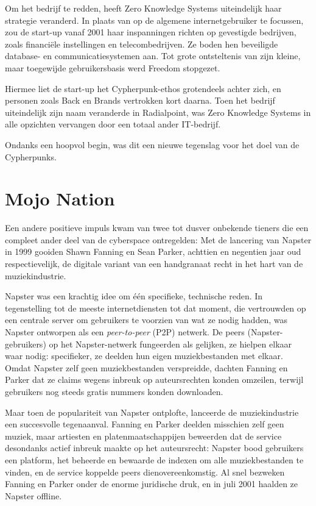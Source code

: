 \documentclass[
  a5paper,
  smalldemyvopaper,11pt,twoside,onecolumn,openright,extrafontsizes]{memoir}
\begin{document}
Om het bedrijf te redden, heeft Zero Knowledge Systems uiteindelijk haar
strategie veranderd. In plaats van op de algemene internetgebruiker te
focussen, zou de start-up vanaf 2001 haar inspanningen richten op
gevestigde bedrijven, zoals financiële instellingen en telecombedrijven.
Ze boden hen beveiligde database- en communicatiesystemen aan. Tot grote
ontsteltenis van zijn kleine, maar toegewijde gebruikersbasis werd
Freedom stopgezet.

Hiermee liet de start-up het Cypherpunk-ethos grotendeels achter zich,
en personen zoals Back en Brands vertrokken kort daarna. Toen het
bedrijf uiteindelijk zijn naam veranderde in Radialpoint, was Zero
Knowledge Systems in alle opzichten vervangen door een totaal ander
IT-bedrijf.

Ondanks een hoopvol begin, was dit een nieuwe tegenslag voor het doel
van de Cypherpunks.

\section{Mojo Nation}\label{mojo-nation}

Een andere positieve impuls kwam van twee tot dusver onbekende tieners
die een compleet ander deel van de cyberspace ontregelden: Met de
lancering van Napster in 1999 gooiden Shawn Fanning en Sean Parker,
achttien en negentien jaar oud respectievelijk, de digitale variant van
een handgranaat recht in het hart van de muziekindustrie.

Napster was een krachtig idee om één specifieke, technische reden. In
tegenstelling tot de meeste internetdiensten tot dat moment, die
vertrouwden op een centrale server om gebruikers te voorzien van wat ze
nodig hadden, was Napster ontworpen als een \emph{peer-to-peer} (P2P)
netwerk. De peers (Napster-gebruikers) op het Napster-netwerk fungeerden
als gelijken, ze hielpen elkaar waar nodig: specifieker, ze deelden hun
eigen muziekbestanden met elkaar. Omdat Napster zelf geen
muziekbestanden verspreidde, dachten Fanning en Parker dat ze claims
wegens inbreuk op auteursrechten konden omzeilen, terwijl gebruikers nog
steeds gratis nummers konden downloaden.

Maar toen de populariteit van Napster ontplofte, lanceerde de
muziekindustrie een succesvolle tegenaanval. Fanning en Parker deelden
misschien zelf geen muziek, maar artiesten en platenmaatschappijen
beweerden dat de service desondanks actief inbreuk maakte op het
auteursrecht: Napster bood gebruikers een platform, het beheerde en
bewaarde de indexen om alle muziekbestanden te vinden, en de service
koppelde peers dienovereenkomstig. Al snel bezweken Fanning en Parker
onder de enorme juridische druk, en in juli 2001 haalden ze Napster
offline.
\end{document}
